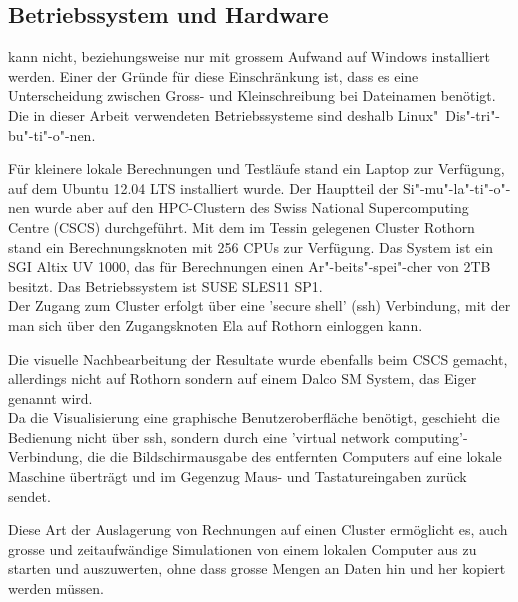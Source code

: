 \subsection{Betriebssystem und Hardware}
\label{Kapitel:Hardware}
\openfoam{} kann nicht, beziehungsweise nur mit grossem Aufwand auf Windows installiert werden. Einer der Gründe für diese Einschränkung ist, dass es eine Unterscheidung zwischen Gross- und Kleinschreibung bei Dateinamen benötigt. Die in dieser Arbeit verwendeten Betriebssysteme sind deshalb Linux"~Dis"-tri"-bu"-ti"-o"-nen.

Für kleinere lokale Berechnungen und Testläufe stand ein Laptop zur Verfügung, auf dem Ubuntu 12.04 LTS installiert wurde.
Der Hauptteil der Si"-mu"-la"-ti"-o"-nen wurde aber auf den HPC-Clustern des Swiss National Supercomputing Centre (CSCS) durchgeführt.
Mit dem im Tessin gelegenen Cluster Rothorn stand ein Berechnungsknoten mit 256 CPUs zur Verfügung. Das System ist ein SGI Altix UV 1000, das für Berechnungen einen Ar"-beits"-spei"-cher von 2TB besitzt.
Das Betriebssystem ist SUSE SLES11 SP1.\\
Der Zugang zum Cluster erfolgt über eine 'secure shell' (ssh) Verbindung, mit der man sich über den Zugangsknoten Ela auf Rothorn einloggen kann.

Die visuelle Nachbearbeitung der Resultate wurde ebenfalls beim CSCS gemacht, allerdings nicht auf Rothorn sondern auf einem Dalco SM System, das Eiger genannt wird.\\
Da die Visualisierung eine graphische Benutzeroberfläche benötigt, geschieht die Bedienung nicht über ssh, sondern durch eine 'virtual network computing'-Verbindung, die die Bildschirmausgabe des entfernten Computers auf eine lokale Maschine überträgt und im Gegenzug Maus- und Tastatureingaben zurück sendet.

Diese Art der Auslagerung von Rechnungen auf einen Cluster ermöglicht es, auch grosse und zeitaufwändige Simulationen von einem lokalen Computer aus zu starten und auszuwerten, ohne dass grosse Mengen an Daten hin und her kopiert werden müssen.
